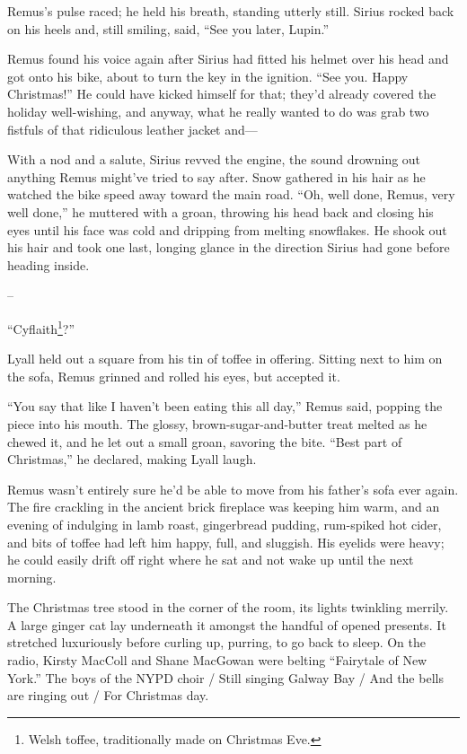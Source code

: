 Remus’s pulse raced; he held his breath, standing utterly still. Sirius rocked back on his heels and, still smiling, said, “See you later, Lupin.”

Remus found his voice again after Sirius had fitted his helmet over his head and got onto his bike, about to turn the key in the ignition. “See you. Happy Christmas!” He could have kicked himself for that; they’d already covered the holiday well-wishing, and anyway, what he really wanted to do was grab two fistfuls of that ridiculous leather jacket and—

With a nod and a salute, Sirius revved the engine, the sound drowning out anything Remus might’ve tried to say after. Snow gathered in his hair as he watched the bike speed away toward the main road. “Oh, well done, Remus, very well done,” he muttered with a groan, throwing his head back and closing his eyes until his face was cold and dripping from melting snowflakes. He shook out his hair and took one last, longing glance in the direction Sirius had gone before heading inside.

--

“Cyflaith\footnote{Welsh toffee, traditionally made on Christmas Eve.}?”

Lyall held out a square from his tin of toffee in offering. Sitting next to him on the sofa, Remus grinned and rolled his eyes, but accepted it.

“You say that like I haven’t been eating this all day,” Remus said, popping the piece into his mouth. The glossy, brown-sugar-and-butter treat melted as he chewed it, and he let out a small groan, savoring the bite. “Best part of Christmas,” he declared, making Lyall laugh.

Remus wasn’t entirely sure he’d be able to move from his father’s sofa ever again. The fire crackling in the ancient brick fireplace was keeping him warm, and an evening of indulging in lamb roast, gingerbread pudding, rum-spiked hot cider, and bits of toffee had left him happy, full, and sluggish. His eyelids were heavy; he could easily drift off right where he sat and not wake up until the next morning.

The Christmas tree stood in the corner of the room, its lights twinkling merrily. A large ginger cat lay underneath it amongst the handful of opened presents. It stretched luxuriously before curling up, purring, to go back to sleep. On the radio, Kirsty MacColl and Shane MacGowan were belting “Fairytale of New York.” The boys of the NYPD choir / Still singing Galway Bay / And the bells are ringing out / For Christmas day.

